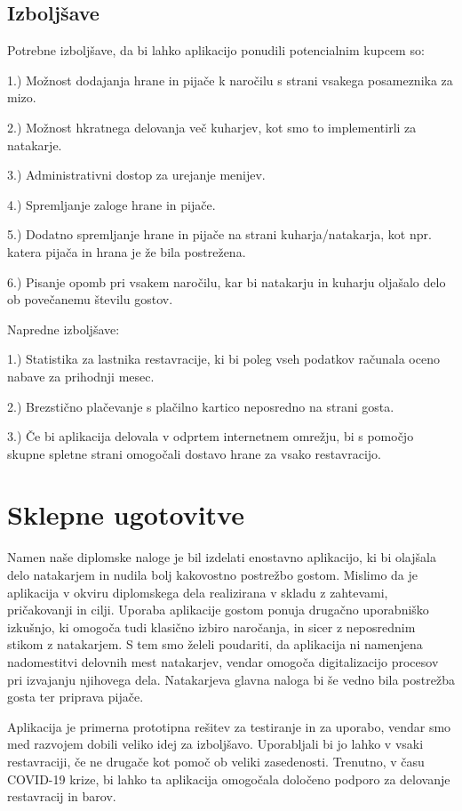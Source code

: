 \documentclass[a4paper, 12pt]{book}
\begin{document}
\section{Izboljšave}

Potrebne izboljšave, da bi lahko aplikacijo ponudili potencialnim kupcem so:

1.) Možnost dodajanja hrane in pijače k naročilu s strani vsakega posameznika za mizo.

2.) Možnost hkratnega delovanja več kuharjev, kot smo to implementirli za natakarje.

3.) Administrativni dostop za urejanje menijev.

4.) Spremljanje zaloge hrane in pijače.

5.) Dodatno spremljanje hrane in pijače na strani kuharja/natakarja, kot npr. katera pijača in hrana je že bila postrežena.

6.) Pisanje opomb pri vsakem naročilu, kar bi natakarju in kuharju oljašalo delo ob povečanemu številu gostov.


Napredne izboljšave: 

1.) Statistika za lastnika restavracije, ki bi poleg vseh podatkov računala oceno nabave za prihodnji mesec.

2.) Brezstično plačevanje s plačilno kartico neposredno na strani gosta.

3.) Če bi aplikacija delovala v odprtem internetnem omrežju, bi s pomočjo skupne spletne strani omogočali dostavo hrane za vsako restavracijo.



\chapter {Sklepne ugotovitve}
Namen naše diplomske naloge je bil izdelati enostavno aplikacijo, ki bi olajšala delo natakarjem in nudila bolj kakovostno postrežbo gostom. Mislimo da je aplikacija v okviru diplomskega dela realizirana v skladu z zahtevami, pričakovanji in cilji. Uporaba aplikacije gostom ponuja drugačno uporabniško izkušnjo, ki omogoča tudi klasično izbiro naročanja, in sicer z neposrednim stikom z natakarjem. S tem smo želeli poudariti, da aplikacija ni namenjena nadomestitvi delovnih mest natakarjev, vendar omogoča digitalizacijo procesov pri izvajanju njihovega dela. Natakarjeva glavna naloga bi še vedno bila postrežba gosta ter priprava pijače. 

Aplikacija je primerna prototipna rešitev za testiranje in za uporabo, vendar smo med razvojem dobili veliko idej za izboljšavo. Uporabljali bi jo lahko v vsaki restavraciji, če ne drugače kot pomoč ob veliki zasedenosti. Trenutno, v času COVID-19 krize, bi lahko ta aplikacija omogočala določeno podporo za delovanje restavracij in barov. 


\newpage %
\ \\
\clearpage
{}


\end{document}
